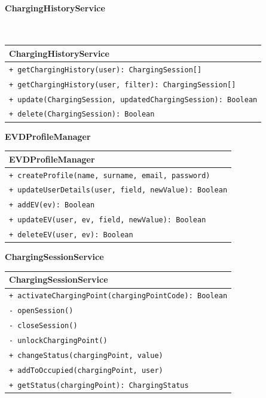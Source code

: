 \paragraph{ChargingHistoryService}\mbox{}\\
\begin{table}[H]
    \centering
    \begin{tabular}{|l|}
        \hline
        \textbf{ChargingHistoryService} \\
        \hline
        \verb|+ getChargingHistory(user): ChargingSession[]|\\
        \verb|+ getChargingHistory(user, filter): ChargingSession[]|\\
        \verb|+ update(ChargingSession, updatedChargingSession): Boolean|\\
        \verb|+ delete(ChargingSession): Boolean|\\
        \hline
    \end{tabular}
\end{table}
\pagebreak
\textbf{EVDProfileManager}\\
\begin{table}[H]
    \centering
    \begin{tabular}{|l|}
        \hline
        \textbf{EVDProfileManager} \\
        \hline
        \verb|+ createProfile(name, surname, email, password)|\\
        \verb|+ updateUserDetails(user, field, newValue): Boolean|\\
        \verb|+ addEV(ev): Boolean|\\
        \verb|+ updateEV(user, ev, field, newValue): Boolean|\\
        \verb|+ deleteEV(user, ev): Boolean|\\
        \hline
    \end{tabular}
\end{table}

\textbf{ChargingSessionService}\\
\begin{table}[H]
    \centering
    \begin{tabular}{|l|}
        \hline
        \textbf{ChargingSessionService} \\
        \hline
        \verb|+ activateChargingPoint(chargingPointCode): Boolean|\\
        \verb|- openSession()|\\
        \verb|- closeSession()|\\
        \verb|- unlockChargingPoint()|\\
        \verb|+ changeStatus(chargingPoint, value)|\\
        \verb|+ addToOccupied(chargingPoint, user)|\\
        \verb|+ getStatus(chargingPoint): ChargingStatus|\\
        \hline
    \end{tabular}
\end{table}

